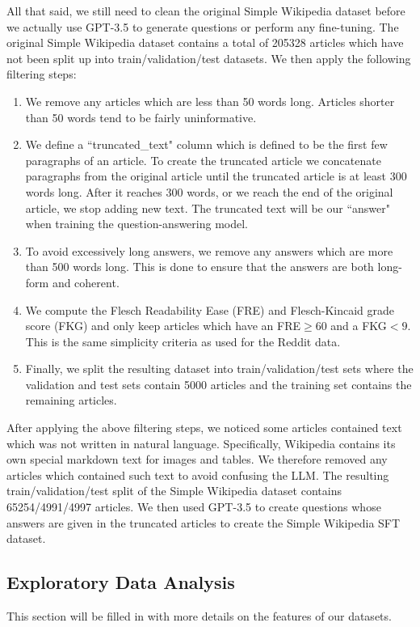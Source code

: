 \documentclass[11pt, oneside]{article}   	%
\begin{document}
All that said, we still need to clean the original Simple Wikipedia dataset before we actually use GPT-3.5 to generate questions or perform any fine-tuning.
The original Simple Wikipedia dataset contains a total of 205328 articles which have not been split up into train/validation/test datasets.
We then apply the following filtering steps:
\begin{enumerate}
\item We remove any articles which are less than 50 words long. Articles shorter than 50 words tend to be fairly uninformative.
\item We define a ``truncated\_text" column which is defined to be the first few paragraphs of an article.
To create the truncated article we concatenate paragraphs from the original article until the truncated article is at least 300 words long. After it reaches 300 words, or we reach the end of the original article, we stop adding new text. The truncated text will be our ``answer" when training the question-answering model.
\item To avoid excessively long answers, we remove any answers which are more than 500 words long. This is done to ensure that the answers are both long-form and coherent.
\item We compute the Flesch Readability Ease (FRE) and Flesch-Kincaid grade score (FKG) and only keep articles which have an FRE$\geq 60$ and a FKG$<9$.
This is the same simplicity criteria as used for the Reddit data.
\item Finally, we split the resulting dataset into train/validation/test sets where the validation and test sets contain 5000 articles and the training set contains the remaining articles.
\end{enumerate}

After applying the above filtering steps, we noticed some articles contained text which was not written in natural language. 
Specifically, Wikipedia contains its own special markdown text for images and tables. 
We therefore removed any articles which contained such text to avoid confusing the LLM.
The resulting train/validation/test split of the Simple Wikipedia dataset contains 65254/4991/4997 articles.
We then used GPT-3.5 to create questions whose answers are given in the truncated articles to create the Simple Wikipedia SFT dataset.

\subsection{Exploratory Data Analysis}
This section will be filled in with more details on the features of our datasets.
\end{document}
